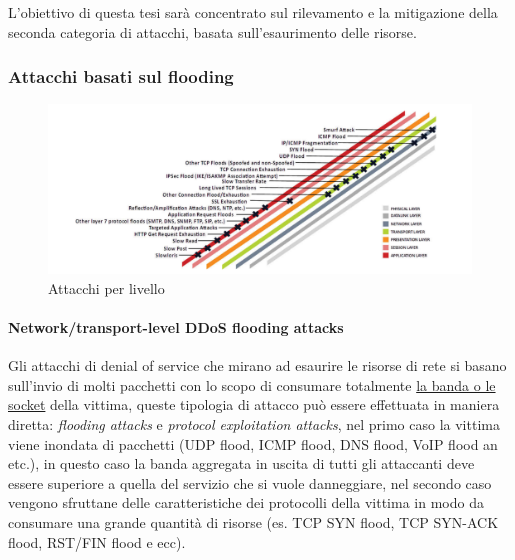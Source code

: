 L'obiettivo di questa tesi sarà concentrato sul rilevamento e la mitigazione della seconda categoria di attacchi, basata sull'esaurimento delle risorse.

\subsubsection{Attacchi basati sul flooding}

\begin{figure}[h]
    \includegraphics[width=\hsize]{images/introduzione/attacchi_per_livello.png}
    \caption{Attacchi per livello \cite{ddos_survey_4}}
    \centering
\end{figure}

\paragraph{Network/transport-level DDoS flooding attacks} %
Gli attacchi di denial of service che mirano ad esaurire le risorse di rete si basano sull'invio di molti pacchetti con lo scopo di consumare totalmente \uline{la banda o le socket} della vittima, queste tipologia di attacco può essere effettuata in maniera diretta: \emph{flooding attacks} e \emph{protocol exploitation attacks}, nel primo caso la vittima viene inondata di pacchetti (UDP flood, ICMP flood, DNS flood, VoIP flood an etc.), in questo caso la banda aggregata in uscita di tutti gli attaccanti deve essere superiore a quella del servizio che si vuole danneggiare, nel secondo caso vengono sfruttane delle caratteristiche dei protocolli della vittima in modo da consumare una grande quantità di risorse (es. TCP SYN flood, TCP SYN-ACK flood, RST/FIN flood e ecc).

